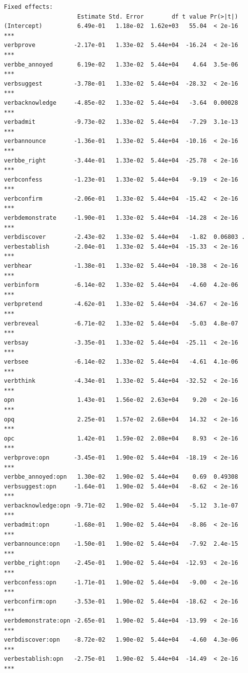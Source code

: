 \documentclass[10pt]{article}\usepackage[]{graphicx}\usepackage[dvipsnames]{xcolor}
\makeatletter
\newenvironment{kframe}{%
 \def\at@end@of@kframe{}%
 \ifinner\ifhmode%
  \def\at@end@of@kframe{\end{minipage}}%
  \begin{minipage}{\columnwidth}%
 \fi\fi%
 \def\FrameCommand##1{\hskip\@totalleftmargin \hskip-\fboxsep
 \colorbox{shadecolor}{##1}\hskip-\fboxsep
     \hskip-\linewidth \hskip-\@totalleftmargin \hskip\columnwidth}%
 \MakeFramed {\advance\hsize-\width
   \@totalleftmargin\z@ \linewidth\hsize
   \@setminipage}}%
 {\par\unskip\endMakeFramed%
 \at@end@of@kframe}
\newenvironment{knitrout}{}{} %
\makeatother
\begin{document}
\begin{knitrout}
\begin{kframe}
\begin{verbatim}
Fixed effects:
                     Estimate Std. Error        df t value Pr(>|t|)    
(Intercept)          6.49e-01   1.18e-02  1.62e+03   55.04  < 2e-16 ***
verbprove           -2.17e-01   1.33e-02  5.44e+04  -16.24  < 2e-16 ***
verbbe_annoyed       6.19e-02   1.33e-02  5.44e+04    4.64  3.5e-06 ***
verbsuggest         -3.78e-01   1.33e-02  5.44e+04  -28.32  < 2e-16 ***
verbacknowledge     -4.85e-02   1.33e-02  5.44e+04   -3.64  0.00028 ***
verbadmit           -9.73e-02   1.33e-02  5.44e+04   -7.29  3.1e-13 ***
verbannounce        -1.36e-01   1.33e-02  5.44e+04  -10.16  < 2e-16 ***
verbbe_right        -3.44e-01   1.33e-02  5.44e+04  -25.78  < 2e-16 ***
verbconfess         -1.23e-01   1.33e-02  5.44e+04   -9.19  < 2e-16 ***
verbconfirm         -2.06e-01   1.33e-02  5.44e+04  -15.42  < 2e-16 ***
verbdemonstrate     -1.90e-01   1.33e-02  5.44e+04  -14.28  < 2e-16 ***
verbdiscover        -2.43e-02   1.33e-02  5.44e+04   -1.82  0.06803 .  
verbestablish       -2.04e-01   1.33e-02  5.44e+04  -15.33  < 2e-16 ***
verbhear            -1.38e-01   1.33e-02  5.44e+04  -10.38  < 2e-16 ***
verbinform          -6.14e-02   1.33e-02  5.44e+04   -4.60  4.2e-06 ***
verbpretend         -4.62e-01   1.33e-02  5.44e+04  -34.67  < 2e-16 ***
verbreveal          -6.71e-02   1.33e-02  5.44e+04   -5.03  4.8e-07 ***
verbsay             -3.35e-01   1.33e-02  5.44e+04  -25.11  < 2e-16 ***
verbsee             -6.14e-02   1.33e-02  5.44e+04   -4.61  4.1e-06 ***
verbthink           -4.34e-01   1.33e-02  5.44e+04  -32.52  < 2e-16 ***
opn                  1.43e-01   1.56e-02  2.63e+04    9.20  < 2e-16 ***
opq                  2.25e-01   1.57e-02  2.68e+04   14.32  < 2e-16 ***
opc                  1.42e-01   1.59e-02  2.08e+04    8.93  < 2e-16 ***
verbprove:opn       -3.45e-01   1.90e-02  5.44e+04  -18.19  < 2e-16 ***
verbbe_annoyed:opn   1.30e-02   1.90e-02  5.44e+04    0.69  0.49308    
verbsuggest:opn     -1.64e-01   1.90e-02  5.44e+04   -8.62  < 2e-16 ***
verbacknowledge:opn -9.71e-02   1.90e-02  5.44e+04   -5.12  3.1e-07 ***
verbadmit:opn       -1.68e-01   1.90e-02  5.44e+04   -8.86  < 2e-16 ***
verbannounce:opn    -1.50e-01   1.90e-02  5.44e+04   -7.92  2.4e-15 ***
verbbe_right:opn    -2.45e-01   1.90e-02  5.44e+04  -12.93  < 2e-16 ***
verbconfess:opn     -1.71e-01   1.90e-02  5.44e+04   -9.00  < 2e-16 ***
verbconfirm:opn     -3.53e-01   1.90e-02  5.44e+04  -18.62  < 2e-16 ***
verbdemonstrate:opn -2.65e-01   1.90e-02  5.44e+04  -13.99  < 2e-16 ***
verbdiscover:opn    -8.72e-02   1.90e-02  5.44e+04   -4.60  4.3e-06 ***
verbestablish:opn   -2.75e-01   1.90e-02  5.44e+04  -14.49  < 2e-16 ***

\end{verbatim}
\end{kframe}
\end{knitrout}
\end{document}
